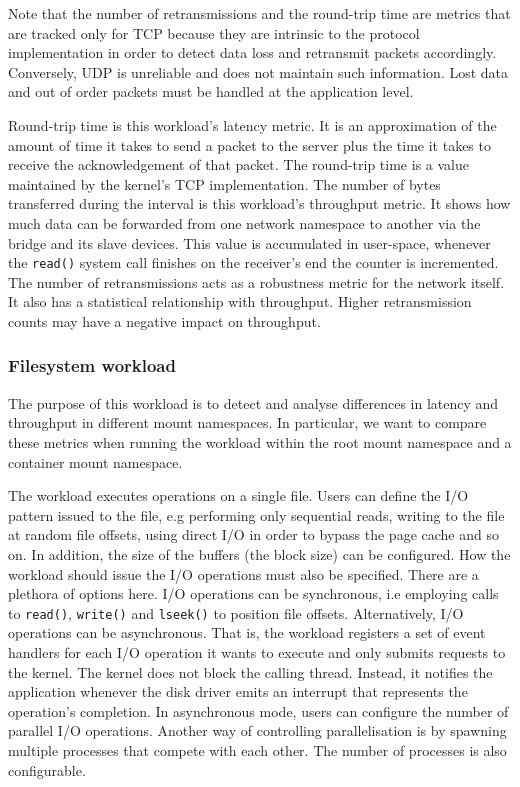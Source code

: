 Note that the number of retransmissions and the round-trip time are metrics that are tracked only 
for TCP because they are intrinsic to the protocol implementation in order to detect data loss 
and retransmit packets accordingly. Conversely, UDP is unreliable and does not maintain such information. 
Lost data and out of order packets must be handled at the application level.

Round-trip time is this workload's latency metric. 
It is an approximation of the amount of time it takes to send a packet 
to the server plus the time it takes to receive the acknowledgement of that packet. 
The round-trip time is a value maintained by the kernel's TCP implementation.
The number of bytes transferred during the interval is this workload's throughput metric.
It shows how much data can be forwarded from one network namespace to another via the bridge
and its slave devices. This value is accumulated in user-space, whenever the \verb|read()| system call 
finishes on the receiver's end the counter is incremented.
The number of retransmissions acts as a robustness metric for the network itself.
It also has a statistical relationship with throughput.
Higher retransmission counts may have a negative impact on throughput.

\subsubsection{Filesystem workload}
\label{ch:concept/benchmark/filesystem-workload}
The purpose of this workload is to detect and analyse differences in latency and throughput in 
different mount namespaces. In particular, we want to compare these metrics when running the 
workload within the root mount namespace and a container mount namespace. 

The workload executes operations on a single file. Users can define the I/O pattern issued to the file,
e.g performing only sequential reads, writing to the file at random file offsets, using direct I/O
in order to bypass the page cache and so on. In addition, the size of the buffers (the block size)
can be configured. How the workload should issue the I/O operations must also be specified. 
There are a plethora of options here. I/O operations can be synchronous, i.e employing calls to 
\verb|read()|, \verb|write()| and \verb|lseek()| to 
position file offsets. Alternatively, I/O operations can be asynchronous. That is, 
the workload registers a set of event handlers for each I/O operation it wants to execute and only 
submits requests to the kernel. The kernel does not block the calling thread. Instead,
it notifies the application whenever the disk driver emits an interrupt that represents 
the operation's completion. In asynchronous mode, users can configure the number of parallel 
I/O operations. Another way of controlling parallelisation is by spawning multiple processes that 
compete with each other. The number of processes is also configurable.

